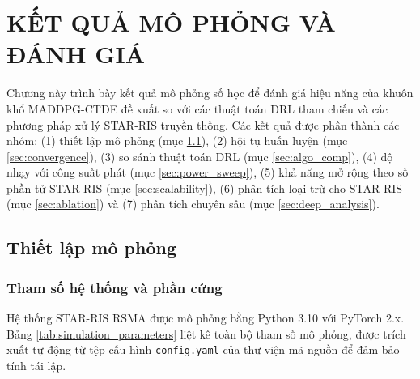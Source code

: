 \chapter{KẾT QUẢ MÔ PHỎNG VÀ ĐÁNH GIÁ}
\label{ch:chuong4}

Chương này trình bày kết quả mô phỏng số học để đánh giá hiệu năng của
khuôn khổ MADDPG-CTDE đề xuất so với các thuật toán DRL tham chiếu và các
phương pháp xử lý STAR-RIS truyền thống. Các kết quả được phân thành các
nhóm: (1) thiết lập mô phỏng (mục \ref{sec:setup}), (2) hội tụ huấn
luyện (mục \ref{sec:convergence}), (3) so sánh thuật toán DRL (mục
\ref{sec:algo_comp}), (4) độ nhạy với công suất phát (mục \ref{sec:power_sweep}),
(5) khả năng mở rộng theo số phần tử STAR-RIS (mục \ref{sec:scalability}),
(6) phân tích loại trừ cho STAR-RIS (mục \ref{sec:ablation}) và (7) phân
tích chuyên sâu (mục \ref{sec:deep_analysis}).

\noindent{}

\section{Thiết lập mô phỏng}
\label{sec:setup}

\subsection{Tham số hệ thống và phần cứng}

Hệ thống STAR-RIS RSMA được mô phỏng bằng Python 3.10 với PyTorch 2.x.
Bảng \ref{tab:simulation_parameters} liệt kê toàn bộ tham số mô phỏng,
được trích xuất tự động từ tệp cấu hình \texttt{config.yaml} của thư
viện mã nguồn để đảm bảo tính tái lập.

